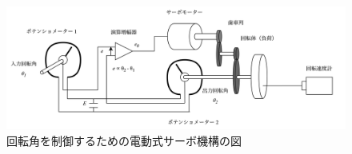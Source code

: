 \begin{figure}
	\centering
	\includegraphics[width=\linewidth]{src/figures/electric-servo-mechanism/electric-servo-mechanism.png}
	\caption{回転角を制御するための電動式サーボ機構の図}\label{fig:electric-servo-mechanism}
\end{figure}
